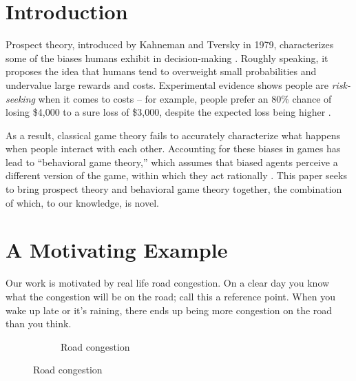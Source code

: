 \documentclass[twoside]{article}
\begin{document}
\begin{multicols}{2} %

\section{Introduction}
Prospect theory, introduced by Kahneman and Tversky in 1979, characterizes some
of the biases humans exhibit in decision-making \cite{Kahneman1979}. Roughly
speaking, it proposes the idea that humans tend to overweight small
probabilities and undervalue large rewards and costs. Experimental evidence
shows people are \textit{risk-seeking} when it comes to costs -- for example,
people prefer an 80\% chance of losing \$4,000 to a sure loss of \$3,000,
despite the expected loss being higher \cite{Kahneman1979}.

As a result, classical game theory fails to accurately characterize what happens
when people interact with each other. Accounting for these biases in games has
lead to ``behavioral game theory,'' which assumes that biased agents perceive a
different version of the game, within which they act rationally \cite{Meir2014}.
This paper seeks to bring prospect theory and behavioral game theory together,
the combination of which, to our knowledge, is novel.

\section{A Motivating Example}
Our work is motivated by real life road congestion. On a clear day you know what the congestion will be on the road; call this a reference point. When you wake up late or it's raining, there ends up being more congestion on the road than you think.

\begin{figure}[H]
  \centering
  \begin{subfigure}[b]{\linewidth}
    \centering
    \caption{Road congestion}
    \label{fig:road}
  \end{subfigure}


\end{figure}
\end{multicols}
\end{document}
